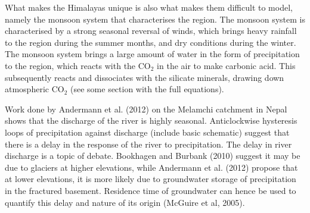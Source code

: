     
\bsk


What makes the Himalayas unique is also what makes them difficult to model, namely the monsoon system that characterises the region.
The monsoon system is characterised by a strong seasonal reversal of winds, which brings heavy rainfall to the region during the summer months, and dry conditions during the winter.
The monsoon system brings a large amount of water in the form of precipitation to the region, which reacts with the CO$_2$ in the air to make carbonic acid. This subsequently reacts and dissociates with the silicate minerals, drawing down atmospheric CO$_2$ (see some section with the full equations).

\bsk

Work done by Andermann et al. (2012) on the Melamchi catchment in Nepal shows that the discharge of the river is highly seasonal. Anticlockwise hysteresis loops of precipitation against discharge (include basic schematic) suggest that there is a delay in the response of the river to precipitation.  The delay in river discharge is a topic of debate. 
Bookhagen and Burbank (2010) suggest it may be due to glaciers at higher elevations, 
while Andermann et al. (2012) propose that at lower elevations, it is more likely due 
to groundwater storage of precipitation in the fractured basement. Residence time of groundwater can hence be used to quantify this delay and nature of its origin (McGuire et al, 2005).

\newpage

